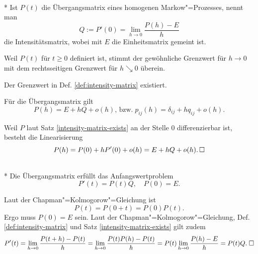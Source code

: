 \begin{Definition}[Intensitätsmatrix]\label{def:intensity-matrix}\mbox{}\\*
Ist $P(t)$ die Übergangsmatrix eines homogenen Markow"=Prozesses, nennt man
\[Q := P'(0) = \lim_{h\to 0}\frac{P(h)-E}{h}\]
die Intensitätsmatrix, wobei mit $E$ die Einheitsmatrix gemeint ist.
\end{Definition}
 Weil $P(t)$ für $t\ge 0$ definiert ist, stimmt der
gewöhnliche Grenzwert für $h\to 0$ mit dem rechtsseitigen Grenzwert
für $h\searrow 0$ überein.

\begin{Satz}\label{intensity-matrix-exists}
Der Grenzwert in Def. \ref{def:intensity-matrix} existiert.
\end{Satz}

\begin{Korollar}
Für die Übergangsmatrix gilt
\[P(h) = E + hQ + o(h),\,\text{bzw.}\; p_{ij}(h) = \delta_{ij} + hq_{ij} + o(h).\]
\end{Korollar}
\begin{Beweis}
Weil $P$ laut Satz \ref{intensity-matrix-exists} an der Stelle $0$
differenzierbar ist, besteht die Linearisierung
\[P(h) = P(0) + hP'(0) + o(h) = E + hQ + o(h).\,\square\]
\end{Beweis}

\begin{Satz}\mbox{}\\*
Die Übergangsmatrix erfüllt das Anfangswertproblem
\[P'(t)=P(t)Q,\quad P(0)=E.\]
\end{Satz}
\begin{Beweis}
Laut der Chapman"=Kolmogorow"=Gleichung ist
\[P(t) = P(0+t) = P(0)P(t).\]
Ergo muss $P(0)=E$ sein. Laut der Chapman"=Kolmogorow"=Gleichung,
Def. \ref{def:intensity-matrix} und Satz \ref{intensity-matrix-exists}
gilt zudem
\[P'(t) = \lim_{h\to 0}\frac{P(t+h)-P(t)}{h}
= \lim_{h\to 0}\frac{P(t)P(h)-P(t)}{h}
= P(t)\lim_{h\to 0}\frac{P(h)-E}{h} = P(t)Q.\;\square\]
\end{Beweis}

